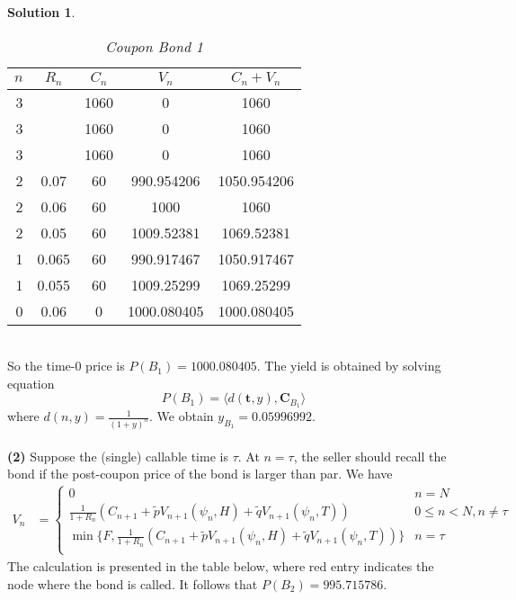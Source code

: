 \documentclass[a4paper, 10pt]{article}
\renewcommand{\arraystretch}{1.4}
\theoremstyle{definition}
\theoremstyle{hSol}
\newtheorem*{solution}{Solution}
\begin{document}
\begin{solution}
\begin{table}[h]
\vspace{-1pt}
\caption{\textit{Coupon Bond 1}}
\vspace{-7pt}
\centering
\def\arraystretch{1.15}
\begin{tabular}{|r|cccc|}
\hline
$n$ & $R_n$ & $C_n$ & $V_n$ & $C_n+V_n$\\ 
\hline
3 &  & 1060 & 0& 1060\\
3 &  & 1060 & 0& 1060\\
3 &  & 1060 & 0& 1060\\
\hline
2 & 0.07 & 60 & 990.954206 & 1050.954206\\
2 & 0.06 & 60 & 1000 & 1060\\
2 & 0.05 & 60 & 1009.52381 & 1069.52381 \\
\hline
1 & 0.065 & 60 & 990.917467 & 1050.917467\\
1 & 0.055 & 60 & 1009.25299 & 1069.25299\\
\hline
0 & 0.06 & 0 & 1000.080405 & 1000.080405\\
\hline
\end{tabular}
\label{tab:bc1}
\end{table}
~\\
So the time-0 price is $P(B_1) = 1000.080405$. The yield is obtained by solving equation
$$
P(B_1) = \langle d(\bm{t}, y), \bm{C}_{B_1} \rangle
$$
where $d(n, y)=\frac{1}{(1+y)^n}$. We obtain $y_{B_1}=0.05996992$.\\
~\\
\textbf{(2)} Suppose the (single) callable time is $\tau$. At $n=\tau$, the seller should recall the bond if the post-coupon price of the bond is larger than par. We have
\begin{equation}
  \begin{split}
  V_n 
  &=\begin{cases}
  0 & n=N\\
  \frac{1}{1+R_{n}}\left(C_{n+1} + \tilde{p}V_{n+1}(\psi_n, H) + \tilde{q}V_{n+1}(\psi_n, T)\right) & 0\leq n < N, n\ne \tau \\
  \min\{F, \frac{1}{1+R_{n}}\left(C_{n+1} + \tilde{p}V_{n+1}(\psi_n, H) + \tilde{q}V_{n+1}(\psi_n, T)\right)\} & n = \tau \\
  \end{cases}
  \end{split}
\end{equation}
The calculation is presented in the table below, where red entry indicates the node where the bond is called. It follows that $P(B_2) = 995.715786$.

\end{solution}
\end{document}
